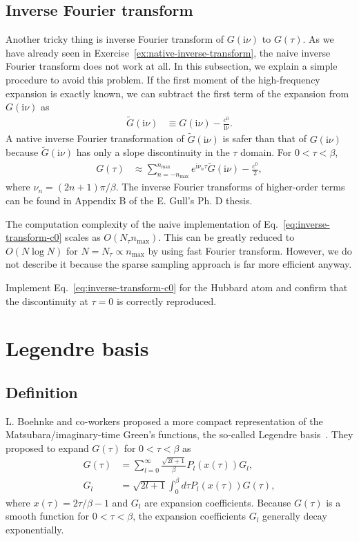 \documentclass[submission, LectureNotes]{SciPost}
\newcommand\ii{\mathrm{i}}%
\newcommand\iv{\ii\nu}%
\begin{document}
\subsection{Inverse Fourier transform}\label{sec:inverse-fourier-transform}
Another tricky thing is inverse Fourier transform of $G(\iv)$ to $G(\tau)$.
As we have already seen in Exercise~\ref{ex:native-inverse-transform},
the naive inverse Fourier transform does not work at all.
In this subsection, we explain a simple procedure to avoid this problem.
If the first moment of the high-frequency expansion is exactly known,
we can subtract the first term of the expansion from $G(\iv)$ as
\begin{align}
    \tilde{G}(\iv) &\equiv G(\iv) - \frac{c^0}{\iv}.
\end{align}
A native inverse Fourier transformation of $\tilde{G}(\iv)$ is safer than that of $G(\iv)$ because 
$\tilde{G}(\iv)$ has only a slope discontinuity in the $\tau$ domain.
For $0 < \tau<\beta$,
\begin{align}
    G(\tau) &\approx \sum_{n=-n_\mathrm{max}}^{n_\mathrm{max}} e^{\ii \nu_n \tau }\tilde{G}(\iv) - \frac{c^0}{2},\label{eq:inverse-transform-c0}
\end{align}
where $\nu_n = (2n+1)\pi/\beta$.
The inverse Fourier transforms of higher-order terms can be found in Appendix B of the E. Gull's Ph. D thesis.

The computation complexity of the naive implementation of Eq.~\eqref{eq:inverse-transform-c0} scales as $O(N_\tau n_\mathrm{max})$.
This can be greatly reduced to $O(N\log N)$ for $N=N_\tau \propto n_\mathrm{max}$ by using fast Fourier transform.
However, we do not describe it because the sparse sampling approach is far more efficient anyway.

\begin{Exercise}
    Implement Eq.~\eqref{eq:inverse-transform-c0} for the Hubbard atom and confirm that the discontinuity at $\tau=0$ is correctly reproduced.
\end{Exercise}


\section{Legendre basis}
\subsection{Definition}
L. Boehnke and co-workers proposed a more compact representation of the Matsubara/imaginary-time Green's functions, the so-called Legendre basis~\cite{Boehnke:2011dd}.
They proposed to expand $G(\tau)$ for $0<\tau<\beta$ as
\begin{align}
    G(\tau) &= \sum_{l=0}^\infty \frac{\sqrt{2l+1}}{\beta} P_l(x(\tau)) G_l,\label{eq:legendre-gtau}\\
    G_l &= \sqrt{2l+1} \int_0^\beta d\tau P_l(x(\tau)) G(\tau),
\end{align}
where $x(\tau) = 2\tau/\beta -1$ and $G_l$ are expansion coefficients.
Because $G(\tau)$ is a smooth function for $0 < \tau < \beta$, the expansion coefficients $G_l$ generally decay exponentially.
\end{document}

